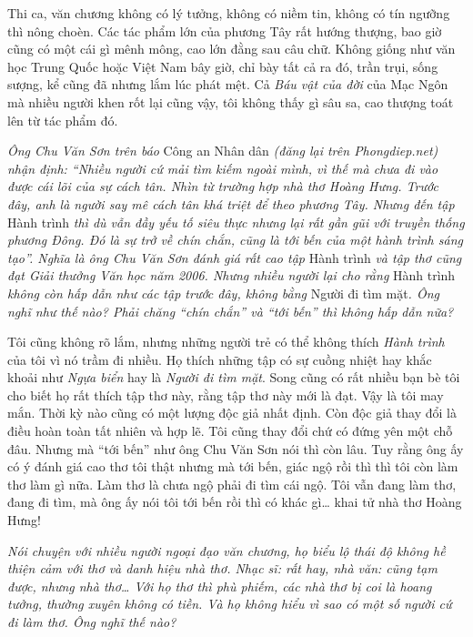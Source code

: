 \documentclass[../main.tex]{subfiles}
\begin{document}
\begin{multicols}{2}
Thi ca, văn chương không có lý tưởng, không có niềm tin, không có tín ngưỡng thì nông choèn. Các tác phẩm lớn của phương Tây rất hướng thượng, bao giờ cũng có một cái gì mênh mông, cao lớn đằng sau câu chữ. Không giống như văn học Trung Quốc hoặc Việt Nam bây giờ, chỉ bày tất cả ra đó, trần trụi, sống sượng, kể cũng đã nhưng lắm lúc phát mệt. Cả \textit{Báu vật của đời} của Mạc Ngôn mà nhiều người khen rốt lại cũng vậy, tôi không thấy gì sâu sa, cao thượng toát lên từ tác phẩm đó.   
  
\textit{Ông Chu Văn Sơn trên báo }Công an Nhân dân\textit{ (đăng lại trên Phongdiep.net) nhận định: “Nhiều người cứ mải tìm kiếm ngoài mình, vì thế mà chưa đi vào được cái lõi của sự cách tân. Nhìn từ trường hợp nhà thơ Hoàng Hưng. Trước đây, anh là người say mê cách tân khá triệt để theo phương Tây. Nhưng đến tập }Hành trình\textit{ thì dù vẫn đầy yếu tố siêu thực nhưng lại rất gần gũi với truyền thống phương Đông. Đó là sự trở về chín chắn, cũng là tới bến của một hành trình sáng tạo”. Nghĩa là ông Chu Văn Sơn đánh giá rất cao tập }Hành trình\textit{ và tập thơ cũng đạt Giải thưởng Văn học năm 2006. Nhưng nhiều người lại cho rằng }Hành trình\textit{ không còn hấp dẫn như các tập trước đây, không bằng }Người đi tìm mặt\textit{. Ông nghĩ như thế nào? Phải chăng “chín chắn” và “tới bến” thì không hấp dẫn nữa?} 
 
Tôi cũng không rõ lắm, nhưng những người trẻ có thể không thích \textit{Hành trình} của tôi vì nó trầm đi nhiều. Họ thích những tập có sự cuồng nhiệt hay khắc khoải như \textit{Ngựa biển} hay là \textit{Người đi tìm mặt}. Song cũng có rất nhiều bạn bè tôi cho biết họ rất thích tập thơ này, rằng tập thơ này mới là đạt. Vậy là tôi may mắn. Thời kỳ nào cũng có một lượng độc giả nhất định. Còn độc giả thay đổi là điều hoàn toàn tất nhiên và hợp lẽ. Tôi cũng thay đổi chứ có đứng yên một chỗ đâu. Nhưng mà “tới bến” như ông Chu Văn Sơn nói thì còn lâu. Tuy rằng ông ấy có ý đánh giá cao thơ tôi thật nhưng mà tới bến, giác ngộ rồi thì thì tôi còn làm thơ làm gì nữa. Làm thơ là chưa ngộ phải đi tìm cái ngộ. Tôi vẫn đang làm thơ, đang đi tìm, mà ông ấy nói tôi tới bến rồi thì có khác gì… khai tử nhà thơ Hoàng Hưng! 
  
\textit{Nói chuyện với nhiều người ngoại đạo văn chương, họ biểu lộ thái độ không hề thiện cảm với thơ và danh hiệu nhà thơ. Nhạc sĩ: rất hay, nhà văn: cũng tạm được, nhưng nhà thơ… Với họ thơ thì phù phiếm, các nhà thơ bị coi là hoang tưởng, thường xuyên không có tiền. Và họ không hiểu vì sao có một số người cứ đi làm thơ. Ông nghĩ thế nào?} 
 

\end{multicols}
\end{document}
